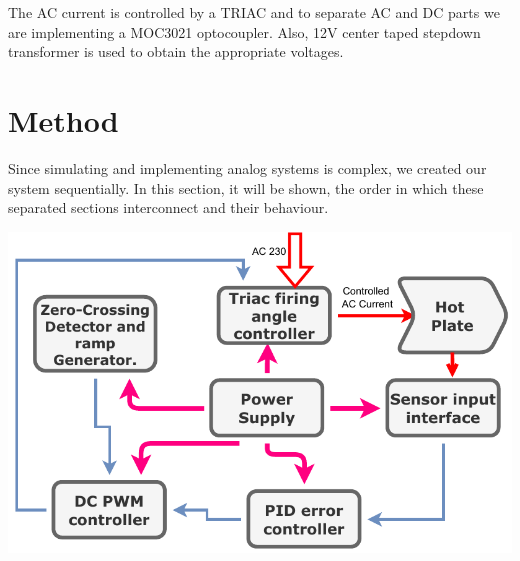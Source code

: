 \begin{multicols}{2}
\begin{center}
\end{center}

The AC current is controlled by a TRIAC and to separate AC and DC parts we are implementing a MOC3021 optocoupler. Also, 12V center taped stepdown transformer is used to obtain the appropriate voltages.

{\let\clearpage\relax \chapter{Method}}

Since simulating and implementing analog systems is complex, we created our system sequentially. In this section, it will be shown, the order in which these separated sections interconnect and their behaviour.

\begin{minipage}{0.5\textwidth}
\centering

\includegraphics[width=\textwidth]{Method/Block diagram.pdf}
\end{minipage}


\end{multicols}
